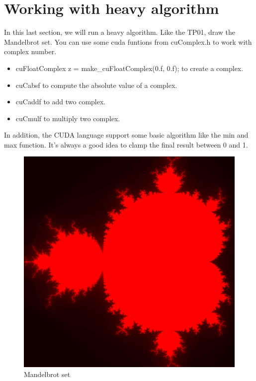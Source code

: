 \documentclass{article}
\begin{document}
\section{Working with heavy algorithm}
In this last section, we will run a heavy algorithm. Like the TP01, draw the Mandelbrot set. You can use some cuda funtions from cuComplex.h to work with complex number.
\begin{itemize}
	\item cuFloatComplex z = make\_cuFloatComplex(0.f, 0.f); to create a complex.
	\item cuCabsf to compute the absolute value of a complex.
	\item cuCaddf to add two complex.
	\item cuCmulf to multiply two complex.
\end{itemize}
In addition, the CUDA language support some basic algorithm like the min and max function. It's always a good idea to clamp the final result between 0 and 1.

\begin{figure}[H]
	\centering
	\includegraphics[scale=0.35]{figures/Mandelbrot.png}
	\caption{Mandelbrot set}
\end{figure}
\end{document}
